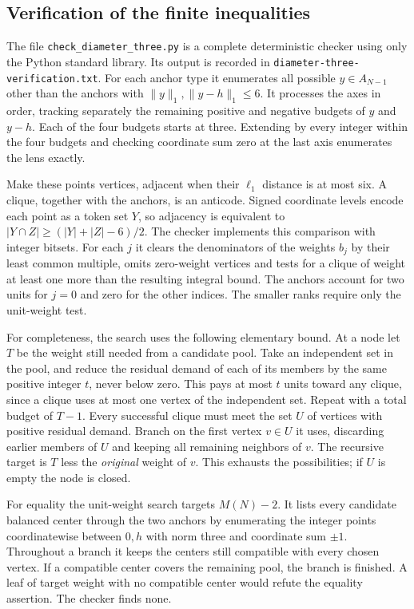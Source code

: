 \documentclass[10pt]{article}
\newcommand{\norm}[1]{\lVert #1\rVert_1}
\begin{document}
\subsection*{Verification of the finite inequalities}

The file \texttt{check\_diameter\_three.py} is a complete deterministic checker using only the Python standard library. Its output is recorded in \texttt{diameter-three-verification.txt}. For each anchor type it enumerates all possible $y\in A_{N-1}$ other than the anchors with $\norm y,\norm{y-h}\le6$. It processes the axes in order, tracking separately the remaining positive and negative budgets of $y$ and $y-h$. Each of the four budgets starts at three. Extending by every integer within the four budgets and checking coordinate sum zero at the last axis enumerates the lens exactly.

Make these points vertices, adjacent when their $\ell_1$ distance is at most six. A clique, together with the anchors, is an anticode. Signed coordinate levels encode each point as a token set $Y$, so adjacency is equivalent to $|Y\cap Z|\ge(|Y|+|Z|-6)/2$. The checker implements this comparison with integer bitsets. For each $j$ it clears the denominators of the weights $b_j$ by their least common multiple, omits zero-weight vertices and tests for a clique of weight at least one more than the resulting integral bound. The anchors account for two units for $j=0$ and zero for the other indices. The smaller ranks require only the unit-weight test.

For completeness, the search uses the following elementary bound. At a node let $T$ be the weight still needed from a candidate pool. Take an independent set in the pool, and reduce the residual demand of each of its members by the same positive integer $t$, never below zero. This pays at most $t$ units toward any clique, since a clique uses at most one vertex of the independent set. Repeat with a total budget of $T-1$. Every successful clique must meet the set $U$ of vertices with positive residual demand. Branch on the first vertex $v\in U$ it uses, discarding earlier members of $U$ and keeping all remaining neighbors of $v$. The recursive target is $T$ less the \emph{original} weight of $v$. This exhausts the possibilities; if $U$ is empty the node is closed.

For equality the unit-weight search targets $M(N)-2$. It lists every candidate balanced center through the two anchors by enumerating the integer points coordinatewise between $0,h$ with norm three and coordinate sum $\pm1$. Throughout a branch it keeps the centers still compatible with every chosen vertex. If a compatible center covers the remaining pool, the branch is finished. A leaf of target weight with no compatible center would refute the equality assertion. The checker finds none.
\end{document}
